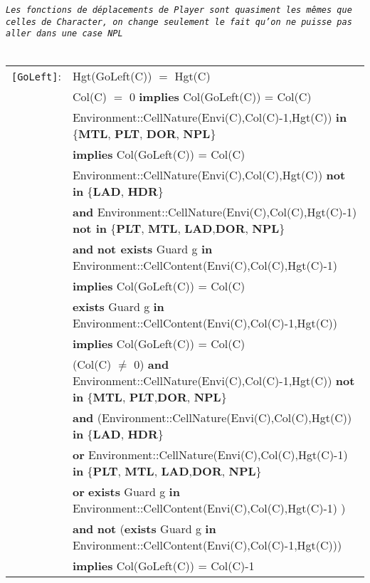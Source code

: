 \documentclass[7pt]{article}
\begin{document}
\texttt{\textit{Les fonctions de déplacements de Player sont quasiment les mêmes que celles de Character, on change seulement le fait qu'on ne puisse pas aller dans une case NPL}} \\ \\

\begin{tabular}{rl}
\texttt{[GoLeft]}: & \textrm{Hgt(GoLeft(C))} $=$ \textrm{Hgt(C)} \\
& \textrm{Col(C)} $=$ 0 \textbf{implies} \textrm{Col(GoLeft(C))} = \textrm{Col(C)} \\
& \textrm{Environment::CellNature(Envi(C),Col(C)-1,Hgt(C))} \textbf{in} \{\textbf{MTL}, \textbf{PLT}, \textbf{DOR}, \textbf{NPL}\} \\
& \quad \textbf{implies} \textrm{Col(GoLeft(C))} = \textrm{Col(C)} \\
& \textrm{Environment::CellNature(Envi(C),Col(C),Hgt(C))} \textbf{not in} \{\textbf{LAD}, \textbf{HDR}\}
\\ & \quad\quad \textbf{and} \textrm{Environment::CellNature(Envi(C),Col(C),Hgt(C)-1)} \textbf{not in} \{\textbf{PLT}, \textbf{MTL}, \textbf{LAD},\textbf{DOR}, \textbf{NPL}\} \\
& \quad\quad \textbf{and} \textbf{not exists} \textrm{Guard} g \textbf{in} \textrm{Environment::CellContent(Envi(C),Col(C),Hgt(C)-1)} \\
& \quad\quad \textbf{implies} \textrm{Col(GoLeft(C))} = \textrm{Col(C)} \\
& \textbf{exists} \textrm{Guard} g \textbf{in} \textrm{Environment::CellContent(Envi(C),Col(C)-1,Hgt(C))} \\ & \quad\quad \textbf{implies} \textrm{Col(GoLeft(C))} = \textrm{Col(C)} \\
& (\textrm{Col(C)} $\neq$ 0) \textbf{and} \textrm{Environment::CellNature(Envi(C),Col(C)-1,Hgt(C))} \textbf{not in} \{\textbf{MTL}, \textbf{PLT},\textbf{DOR}, \textbf{NPL}\} \\
& \quad\quad \textbf{and} (\textrm{Environment::CellNature(Envi(C),Col(C),Hgt(C))} \textbf{in} \{\textbf{LAD}, \textbf{HDR}\} \\
& \quad\quad\quad\quad \textbf{or} \textrm{Environment::CellNature(Envi(C),Col(C),Hgt(C)-1)} \textbf{in} \{\textbf{PLT}, \textbf{MTL}, \textbf{LAD},\textbf{DOR}, \textbf{NPL}\} \\
& \quad\quad\quad\quad \textbf{or} \textbf{exists} \textrm{Guard} g \textbf{in} \textrm{Environment::CellContent(Envi(C),Col(C),Hgt(C)-1)} ) \\
& \quad\quad \textbf{and} \textbf{not} (\textbf{exists} \textrm{Guard} g \textbf{in} \textrm{Environment::CellContent(Envi(C),Col(C)-1,Hgt(C))}) \\
& \quad\quad \textbf{implies} \textrm{Col(GoLeft(C))} = \textrm{Col(C)}-1 \\


\end{tabular}
\end{document}
